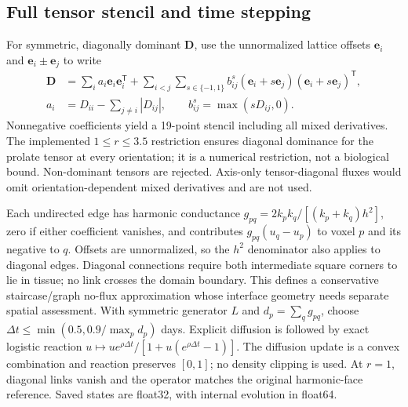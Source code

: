 \subsection{Full tensor stencil and time stepping}
For symmetric, diagonally dominant $\mathbf D$, use the unnormalized lattice offsets $\bm e_i$ and $\bm e_i\pm\bm e_j$ to write
\begin{align}
 \mathbf D&=\sum_i a_i\bm e_i\bm e_i^{\mathsf T}
 +\sum_{i<j}\sum_{s\in\{-1,1\}}b_{ij}^{s}(\bm e_i+s\bm e_j)(\bm e_i+s\bm e_j)^{\mathsf T},\\
 a_i&=D_{ii}-\sum_{j\ne i}|D_{ij}|,\qquad b_{ij}^{s}=\max(sD_{ij},0).
\end{align}
Nonnegative coefficients yield a 19-point stencil including all mixed derivatives. The implemented $1\leq r\leq3.5$ restriction ensures diagonal dominance for the prolate tensor at every orientation; it is a numerical restriction, not a biological bound. Non-dominant tensors are rejected. Axis-only tensor-diagonal fluxes would omit orientation-dependent mixed derivatives and are not used.

Each undirected edge has harmonic conductance $g_{pq}=2k_pk_q/[(k_p+k_q)h^2]$, zero if either coefficient vanishes, and contributes $g_{pq}(u_q-u_p)$ to voxel $p$ and its negative to $q$. Offsets are unnormalized, so the $h^2$ denominator also applies to diagonal edges. Diagonal connections require both intermediate square corners to lie in tissue; no link crosses the domain boundary. This defines a conservative staircase/graph no-flux approximation whose interface geometry needs separate spatial assessment. With symmetric generator $L$ and $d_p=\sum_q g_{pq}$, choose $\Delta t\leq\min(0.5,0.9/\max_p d_p)$ days. Explicit diffusion is followed by exact logistic reaction $u\mapsto u e^{\rho\Delta t}/[1+u(e^{\rho\Delta t}-1)]$. The diffusion update is a convex combination and reaction preserves $[0,1]$; no density clipping is used. At $r=1$, diagonal links vanish and the operator matches the original harmonic-face reference. Saved states are float32, with internal evolution in float64.

